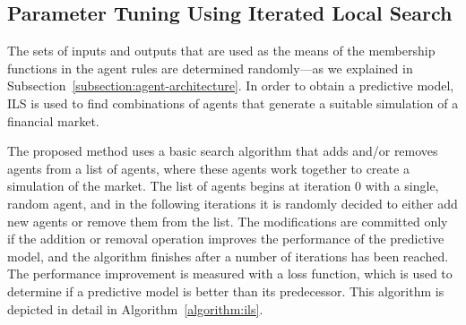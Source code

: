 ﻿\documentclass{ieeeaccess}
\begin{document}

\subsection{Parameter Tuning Using Iterated Local Search} %
\label{subsection:ils}


The sets of inputs and outputs that are used as the means of the
membership functions in the agent rules are determined randomly---as
we explained in Subsection~\ref{subsection:agent-architecture}. In
order to obtain a predictive model, ILS is used to find
combinations of agents that generate a suitable simulation of a
financial market.

The proposed method uses a basic search algorithm that adds and/or removes
agents from a list of agents, where these agents work together to create a
simulation of the market. The list of agents begins at iteration 0 with a
single, random agent, and in the following iterations it is randomly decided to either
add new agents or remove them from the list. The modifications are committed
only if the addition or removal operation improves the performance of the
predictive model, and the algorithm finishes after a number of iterations
has been reached. %
The performance improvement is measured with a loss function, which is
used to determine if a predictive model is better than its
predecessor. %
This algorithm is depicted in detail in
Algorithm~\ref{algorithm:ils}. %
\end{document}
